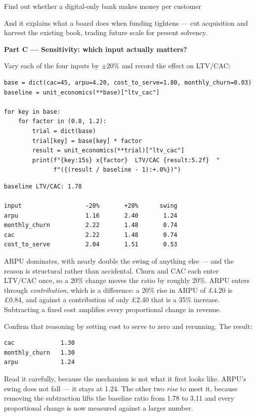 \begin{labproject}{Find out whether a digital-only bank makes money per customer}
\begin{keyidea}
And it explains what a board does when funding tightens --- cut acquisition and harvest the existing book, trading future scale for present solvency.
\end{keyidea}

\medskip\noindent\textbf{Part C --- Sensitivity: which input actually matters?}\par
Vary each of the four inputs by $\pm 20\%$ and record the effect on LTV/CAC:

\begin{lstlisting}[style=mlpython]
base = dict(cac=45, arpu=4.20, cost_to_serve=1.80, monthly_churn=0.03)
baseline = unit_economics(**base)["ltv_cac"]

for key in base:
    for factor in (0.8, 1.2):
        trial = dict(base)
        trial[key] = base[key] * factor
        result = unit_economics(**trial)["ltv_cac"]
        print(f"{key:15s} x{factor}  LTV/CAC {result:5.2f}  "
              f"({(result / baseline - 1):+.0%})")
\end{lstlisting}

\begin{lstlisting}[style=mlterminal]
baseline LTV/CAC: 1.78

input                  -20%       +20%      swing
arpu                   1.16       2.40       1.24
monthly_churn          2.22       1.48       0.74
cac                    2.22       1.48       0.74
cost_to_serve          2.04       1.51       0.53
\end{lstlisting}

ARPU dominates, with nearly double the swing of anything else --- and the reason is structural rather than accidental. Churn and CAC each enter LTV/CAC once, so a 20\% change moves the ratio by roughly 20\%. ARPU enters through \emph{contribution}, which is a difference: a 20\% rise in ARPU of \pounds4.20 is \pounds0.84, and against a contribution of only \pounds2.40 that is a 35\% increase. Subtracting a fixed cost amplifies every proportional change in revenue.

\begin{tryit}
Confirm that reasoning by setting cost to serve to zero and rerunning. The result:

\begin{lstlisting}[style=mlterminal]
cac             1.30
monthly_churn   1.30
arpu            1.24
\end{lstlisting}

Read it carefully, because the mechanism is not what it first looks like. ARPU's swing does not fall --- it stays at 1.24. The other two \emph{rise} to meet it, because removing the subtraction lifts the baseline ratio from 1.78 to 3.11 and every proportional change is now measured against a larger number.


\end{tryit}
\end{labproject}
